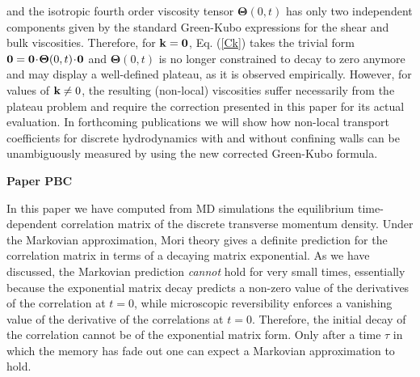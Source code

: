 \documentclass[a4paper,openright,12pt]{book}
\newcommand{\esc}{\!\cdot\!}
\newcommand{\Note}[1]{{\bf \color{red}#1}}    %
\begin{document}
and     the     isotropic     fourth    order     viscosity     tensor
$\boldsymbol{\Theta}(0,t)$ has  only two independent  components given
by  the  standard  Green-Kubo  expressions  for  the  shear  and  bulk
viscosities.  Therefore, for ${\bf  k}={\bf 0}$, Eq.  (\ref{Ck}) takes
the trivial form ${\bf 0}={\bf 0}\esc \boldsymbol{\Theta}(0,t)\esc{\bf
  0}$ and $\boldsymbol{\Theta}(0,t)$ is no longer constrained to decay
to  zero anymore  and may  display a  well-defined plateau,  as it  is
observed  empirically. However,  for values  of ${\bf  k}\neq 0$,  the
resulting (non-local) viscosities suffer  necessarily from the plateau
problem and  require the  correction presented in  this paper  for its
actual  evaluation.   In forthcoming  publications  we  will show  how
non-local transport  coefficients for discrete hydrodynamics  with and
without confining walls can be unambiguously measured by using the new
corrected Green-Kubo formula.




\Note{Paper PBC}



In this  paper we  have computed from  MD simulations  the equilibrium
time-dependent correlation matrix of  the discrete transverse momentum
density.   Under  the Markovian  approximation,  Mori  theory gives  a
definite prediction for the correlation  matrix in terms of a decaying
matrix exponential.   As we  have discussed, the  Markovian prediction
\textit{cannot}  hold for  very small  times, essentially  because the
exponential matrix decay predicts a  non-zero value of the derivatives
of the correlation at  $t=0$, while microscopic reversibility enforces
a  vanishing value  of the  derivative of  the correlations  at $t=0$.
Therefore,  the initial  decay of  the  correlation cannot  be of  the
exponential matrix form.  Only after a time $\tau$ in which the memory
has fade out one can expect a Markovian approximation to hold. 
\end{document}

